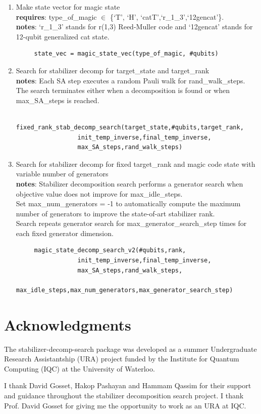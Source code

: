 \documentclass[11pt]{article}
\newcommand{\blank}[1]{\hspace*{#1}}
\begin{document}
\begin{enumerate}
\item Make state vector for magic state\\
  \textbf{ requires}: type\_of\_magic $\in$ \{`T', `H', `catT',`r\_1\_3',`12gencat'\}. \\
   \textbf{notes}: `r\_1\_3' stands for r(1,3) Reed-Muller code and `12gencat' stands for 12-qubit generalized cat state.
  \begin{verbatim}
     state_vec = magic_state_vec(type_of_magic, #qubits)
  \end{verbatim}  
  
\item Search for stabilizer decomp for target\_state and target\_rank\\
  \textbf{notes}: Each SA step executes a random Pauli walk for rand\_walk\_steps.\\
  \blank{1.2cm}The search terminates either when a decomposition is found or when max\_SA\_steps is  reached.
  \begin{verbatim}
     fixed_rank_stab_decomp_search(target_state,#qubits,target_rank,
                 init_temp_inverse,final_temp_inverse,
                 max_SA_steps,rand_walk_steps)
  \end{verbatim}  
  
\item Search for stabilizer decomp for fixed target\_rank and magic code state with variable number of generators\\
 \textbf{notes}: Stabilizer decomposition search performs a generator search when objective value does not improve for max\_idle\_steps.\\
 \blank{1.2cm}Set max\_num\_generators = -1 to automatically compute the maximum number of generators to improve the state-of-art stabilizer rank.\\
 \blank{1.2cm} Search repeats generator search for max\_generator\_search\_step times for each fixed generator dimension.
  \begin{verbatim}
     magic_state_decomp_search_v2(#qubits,rank,
                 init_temp_inverse,final_temp_inverse,
                 max_SA_steps,rand_walk_steps,
                 max_idle_steps,max_num_generators,max_generator_search_step)
  \end{verbatim}  
  
\end{enumerate}

\section*{Acknowledgments}
The stabilizer-decomp-search package was developed as a summer Undergraduate Research Assistantship (URA) project funded by the Institute for Quantum Computing (IQC) at the University of Waterloo.

I thank David Gosset, Hakop Pashayan and Hammam Qassim for their support and guidance throughout the stabilizer decomposition search project. I thank Prof. David Gosset for giving me the opportunity to work as an URA at IQC.


 
\end{document}
